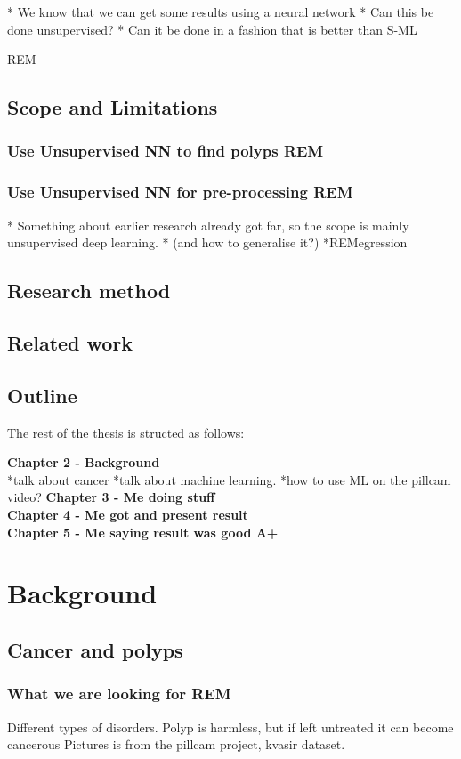 \documentclass[a4paper,english]{ifimaster}
\begin{document}
		* We know that we can get some results using a neural network
		* Can this be done unsupervised?
		* Can it be done in a fashion that is better than S-ML
		 
		 REM

		
	\section{Scope and Limitations}
		\subsection{Use Unsupervised NN to find polyps REM}
		\subsection{Use Unsupervised NN for pre-processing REM}
		* Something about earlier research already got far, so the scope is mainly unsupervised deep learning.
		* (and how to generalise it?)
*REMegression	
		

	\section{Research method}
	\section{Related work}
	\section{Outline}
	The rest of the thesis is structed as follows:
	
	\textbf{Chapter 2 - Background}\\
	*talk about cancer
	*talk about machine learning.
	*how to use ML on the pillcam video?
	\textbf{Chapter 3 - Me doing stuff}\\
	\textbf{Chapter 4 - Me got and present result}\\
	\textbf{Chapter 5 - Me saying result was good A+}\\
	
	
\chapter{Background}
	\section{Cancer and polyps}
	  \subsection{What we are looking for REM}
	  Different types of disorders.
	  Polyp is harmless, but if left untreated it can become cancerous
	  Pictures is from the pillcam project, kvasir dataset.
\end{document}
